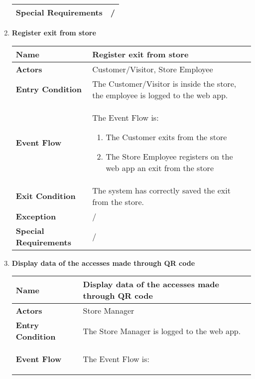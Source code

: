 \begin{enumerate}
{\begin{longtable}{|L{4cm}|L{10cm}|}
                \textbf{Special Requirements} & / \\
                \hline
            \end{longtable}}
            \item \textbf{Register exit from store}{\renewcommand{\arraystretch}{2}
            \begin{longtable}{|L{4cm}|L{10cm}|}
                \hline
                \textbf{Name} & Register exit from store \\
                \hline
                \textbf{Actors} & Customer/Visitor, Store Employee \\
                \hline
                \textbf{Entry Condition} & The Customer/Visitor is inside the store, the employee is logged to the web app. \\
                \hline
                \textbf{Event Flow} &  The Event Flow is: \begin{enumerate}
                        \item The Customer exits from the store
                        \item The Store Employee registers on the web app an exit from the store 
                    \end{enumerate}\\
                \hline
                \textbf{Exit Condition} & The system has correctly saved the exit from the store. \\
                \hline
                \textbf{Exception} & / \\
                \hline
                \textbf{Special Requirements} & / \\
                \hline
            \end{longtable}}
            \item \textbf{Display data of the accesses made through QR code}{\renewcommand{\arraystretch}{2}
            \begin{longtable}{|L{4cm}|L{10cm}|}
                \hline
                \textbf{Name} & Display data of the accesses made through QR code \\
                \hline
                \textbf{Actors} & Store Manager \\
                \hline
                \textbf{Entry Condition} & The Store Manager is logged to the web app. \\
                \hline
                    \textbf{Event Flow} & The Event Flow is: \begin{enumerate}

\end{enumerate}
\end{longtable}}
\end{enumerate}
